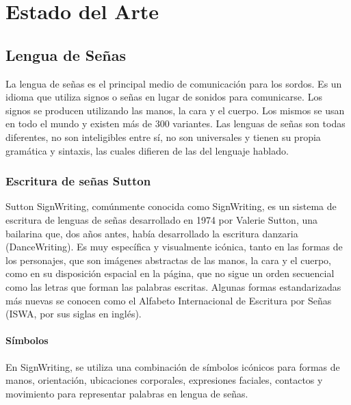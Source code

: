 \chapter{Estado del Arte}\label{chapter:state-of-the-art}

\section{Lengua de Señas}\label{section:state-of-the-art:sl}
La lengua de señas es el principal medio de comunicación para los sordos. Es un idioma que utiliza signos o señas en lugar de sonidos para comunicarse. Los signos se producen utilizando las manos, la cara y el cuerpo. Los mismos se usan en todo el mundo y existen más de 300 variantes.
Las lenguas de señas son todas diferentes, no son inteligibles entre sí, no son universales y tienen su propia gramática y sintaxis, las cuales difieren de las del lenguaje hablado.

\subsection{Escritura de señas Sutton}\label{subsection:state-of-the-art:sw}
Sutton SignWriting, comúnmente conocida como SignWriting, es un sistema de escritura de lenguas de señas desarrollado en 1974 por Valerie Sutton, una bailarina que, dos años antes, había desarrollado la escritura danzaria (DanceWriting). Es muy específica y visualmente icónica, tanto en las formas de los personajes, que son imágenes abstractas de las manos, la cara y el cuerpo, como en su disposición espacial en la página, que no sigue un orden secuencial como las letras que forman las palabras escritas. Algunas formas estandarizadas más nuevas se conocen como el Alfabeto Internacional de Escritura por Señas (ISWA, por sus siglas en inglés).

\subsubsection{Símbolos}\label{subsubsection:state-of-the-art:sl:symbols}

En SignWriting, se utiliza una combinación de símbolos icónicos para formas de manos, orientación, ubicaciones corporales, expresiones faciales, contactos y movimiento para representar palabras en lengua de señas.


